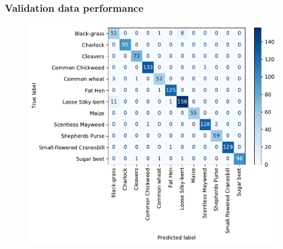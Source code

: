 \documentclass{beamer}
\begin{document}
\begin{frame}
	\frametitle{Validation data performance}
	
	\begin{figure}[h]
		\begin{center}
			\includegraphics[width=0.78\linewidth]{confusion_matrix.pdf}
		\end{center}
		\label{fig:cm}
	\end{figure}
	
\end{frame}
\end{document}
